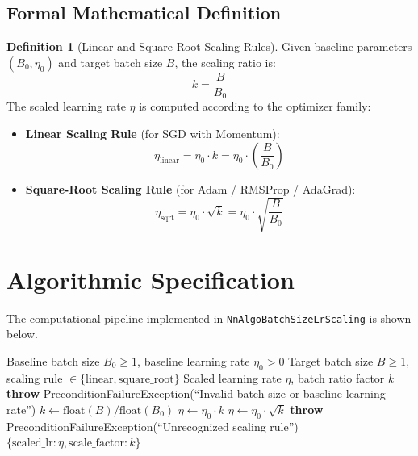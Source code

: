\documentclass[11pt,a4paper]{article}
\theoremstyle{definition}
\newtheorem{definition}{Definition}[section]
\begin{document}
\subsection{Formal Mathematical Definition}
\begin{definition}[Linear and Square-Root Scaling Rules]
Given baseline parameters $(B_0, \eta_0)$ and target batch size $B$, the scaling ratio is:
\begin{equation}
k = \frac{B}{B_0} \label{eq:scale_ratio}
\end{equation}
The scaled learning rate $\eta$ is computed according to the optimizer family:
\begin{itemize}
    \item \textbf{Linear Scaling Rule} (for SGD with Momentum):
    \begin{equation}
    \eta_{\text{linear}} = \eta_0 \cdot k = \eta_0 \cdot \left(\frac{B}{B_0}\right) \label{eq:linear_scale}
    \end{equation}
    \item \textbf{Square-Root Scaling Rule} (for Adam / RMSProp / AdaGrad):
    \begin{equation}
    \eta_{\text{sqrt}} = \eta_0 \cdot \sqrt{k} = \eta_0 \cdot \sqrt{\frac{B}{B_0}} \label{eq:sqrt_scale}
    \end{equation}
\end{itemize}
\end{definition}

\section{Algorithmic Specification}

The computational pipeline implemented in \texttt{NnAlgoBatchSizeLrScaling} is shown below.

\begin{algorithm}[H]
\caption{Batch Size Learning Rate Scaling Computation}
\begin{algorithmic}[1]
\Require Baseline batch size $B_0 \ge 1$, baseline learning rate $\eta_0 > 0$
\Require Target batch size $B \ge 1$, scaling rule $\in \{\text{linear}, \text{square\_root}\}$
\Ensure Scaled learning rate $\eta$, batch ratio factor $k$
    \State \textbf{throw} PreconditionFailureException(``Invalid batch size or baseline learning rate'')
\EndIf
\State $k \gets \text{float}(B) / \text{float}(B_0)$
    \State $\eta \gets \eta_0 \cdot k$
    \State $\eta \gets \eta_0 \cdot \sqrt{k}$
\Else
    \State \textbf{throw} PreconditionFailureException(``Unrecognized scaling rule'')
\EndIf
\State \Return $\{\text{scaled\_lr}: \eta, \text{scale\_factor}: k\}$
\end{algorithmic}
\end{algorithm}
\end{document}
